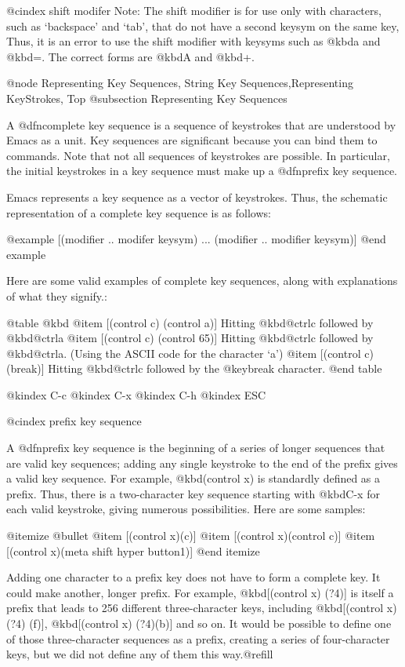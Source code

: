 {{@cindex shift modifer
  Note: The shift modifier is for use only with characters, such as
`backspace' and `tab', that do not have a second keysym on the same key,
Thus, it is an error to use the shift modifier with keysyms such as
@kbd{a} and @kbd{=}. The correct forms are @kbd{A} and @kbd{+}.

@node Representing Key Sequences, String Key Sequences,Representing KeyStrokes, Top
@subsection Representing Key Sequences

  A @dfn{complete key sequence} is a sequence of keystrokes that are
understood by Emacs as a unit.  Key sequences are significant because
you can bind them to commands.  Note that not all sequences of
keystrokes are possible. In particular, the initial keystrokes in a key
sequence must make up a @dfn{prefix key sequence}.

  Emacs represents a key sequence as a vector of keystrokes. 
Thus, the schematic representation of a complete key sequence is
as follows:

@example
  [(modifier .. modifer keysym) ... (modifier .. modifier keysym)]
@end example

  Here are some valid examples of complete key sequences, along with 
explanations of what they signify.:

@table @kbd
@item [(control c) (control a)]	
Hitting @kbd{@ctrl{c}} followed by @kbd{@ctrl{a}}
@item [(control c) (control 65)]	
Hitting @kbd{@ctrl{c}} followed by @kbd{@ctrl{a}}. (Using the ASCII code for 
the character `a')
@item [(control c)(break)]
Hitting @kbd{@ctrl{c}} followed by the @key{break} character.
@end table

@kindex C-c
@kindex C-x
@kindex C-h
@kindex ESC

@cindex prefix key sequence

  A @dfn{prefix key sequence} is the beginning of a series of longer sequences
that are valid key sequences; adding any single keystroke to the end of
the prefix gives a valid key sequence. For example, @kbd{(control x)}
is standardly defined as a prefix.  Thus, there is a two-character key
sequence starting with @kbd{C-x} for each valid keystroke, giving
numerous possibilities. Here are some samples:

@itemize @bullet
@item
[(control x)(c)]
@item
[(control x)(control c)]
@item
[(control x)(meta shift hyper button1)]
@end itemize

  Adding one character to a prefix key does not have to form a complete
key.  It could make another, longer prefix.  For example, @kbd{[(control
x) (?4)]} is itself a prefix that leads to 256 different three-character
keys, including @kbd{[(control x)  (?4) (f)]}, @kbd{[(control x) (?4)(b)]}
and so on.  It would be possible to define one of those three-character
sequences as a prefix, creating a series of four-character keys, but we
did not define any of them this way.@refill

}}
